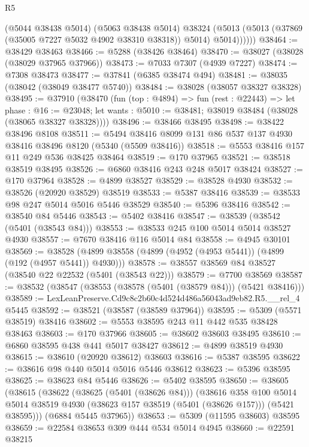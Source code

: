 \begin{lexlean}{R5}
\begin{coremodule}
              (@5044 @38438 @5014)
              (@5063 @38438 @5014)
              @38324
              (@5013 (@5013 (@37869 (@35005 @7227 @5032 @4902 @38310 @38318)) @5014) @5014))))))
@38464 := @38429 @38463
@38466 := @5288 (@38426 @38464)
@38470 := @38027 (@38028 (@38029 @37965 @37966))
@38473 := @7033 @7307 (@4939 @7227)
@38474 := @7308 @38473
@38477 := @37841 (@6385 @38474 @494)
@38481 := @38035 (@38042 (@38049 @38477 @5740))
@38484 := @38028 (@38057 @38327 @38328)
@38495 := @37910
    (@38470
      (fun (top : @4894) =>
      fun (rest : @22443) =>
      let phase : @16 := @23048;
      let wants : @5010 := @38481; @38019 @38484 (@38028 (@38065 @38327 @38328))))
@38496 := @38466 @38495
@38498 := @38422 @38496 @8108
@38511 := @5494 @38416 @8099 @131 @86 @537 @137 @4930 @38416 @38496 @8120 (@5340 (@5509 @38416))
@38518 := @5553 @38416 @157 @11 @249 @536 @38425 @38464
@38519 := @170 @37965
@38521 := @38518 @38519 @38495
@38526 := @6860 @38416 @243 @248 @5017 @38424
@38527 := @170 @37964
@38528 := @4899 @38527
@38529 := @38528 @4930
@38532 := @38526 (@20920 @38529) @38519
@38533 := @5387 @38416
@38539 := @38533 @98 @247 @5014 @5016 @5446 @38529
@38540 := @5396 @38416
@38542 := @38540 @84 @5446
@38543 := @5402 @38416
@38547 := @38539 (@38542 (@5401 (@38543 @84)))
@38553 := @38533 @245 @100 @5014 @5014 @38527 @4930
@38557 := @7670 @38416 @116 @5014 @84
@38558 := @4945 @30101
@38569 := @38528 (@4899 @38558 (@4899 (@4952 (@4953 @5441)) (@4899 (@192 (@4957 @5441)) @4930)))
@38578 := @38557 @38569 @84 @38527 (@38540 @22 @22532 (@5401 (@38543 @22)))
@38579 := @7700 @38569
@38587 := @38532 (@38547 (@38553 (@38578 (@5401 (@38579 @84))) (@5421 @38416)))
@38589 := LexLeanPreserve.Cd9c8c2b60c4d524d486a56043ad9eb82.R5.__rel_4 @5445
@38592 := @38521 (@38587 (@38589 @37964))
@38595 := @5309 (@5571 @38519) @38416
@38602 := @5553 @38595 @243 @11 @442 @535 @38428 @38463
@38603 := @170 @37966
@38605 := @38602 @38603 @38495
@38610 := @6860 @38595 @438 @441 @5017 @38427
@38612 := @4899 @38519 @4930
@38615 := @38610 (@20920 @38612) @38603
@38616 := @5387 @38595
@38622 := @38616 @98 @440 @5014 @5016 @5446 @38612
@38623 := @5396 @38595
@38625 := @38623 @84 @5446
@38626 := @5402 @38595
@38650 := @38605
    (@38615
      (@38622
        (@38625 (@5401 (@38626 @84)))
        (@38616
          @358
          @100
          @5014
          @5014
          @38519
          @4930
          (@38623 @157 @38519 (@5401 (@38626 @157)))
          (@5421 @38595)))
      (@6884 @5445 @37965))
@38653 := @5309 (@11595 @38603) @38595
@38659 := @22584 @38653 @309 @444 @534 @5014 @4945
@38660 := @22591 @38215

\end{coremodule}
\end{lexlean}
